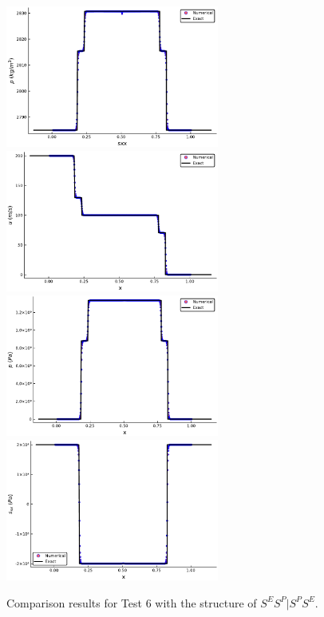 \documentclass[review]{elsarticle}
\numberwithin{equation}{section}
\numberwithin{table}{section}
\begin{document}
\begin{figure}[ht]
  \centering
 \includegraphics[width= 7cm] {case21rho.pdf}
  \includegraphics[width= 7cm] {case21u.pdf}
  \includegraphics[width= 7cm] {case21p.pdf}
  \includegraphics[width= 7cm] {case21sxx.pdf}
    \caption{Comparison results for Test 6 with the structure of $S^ES^P|S^PS^E$.  }
  \label{fig:case21}
\end{figure}
\end{document}
